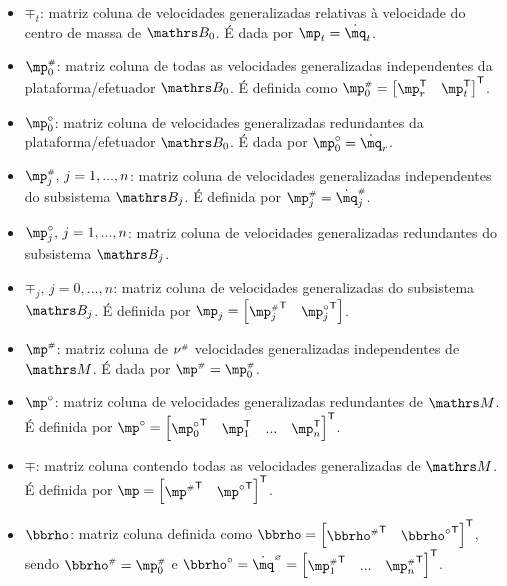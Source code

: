 \documentclass[a4paper,11pt,brazil,fleqn]{article}
\begin{document}
\begin{itemize}
\item $\mp_t$: matriz coluna de velocidades generalizadas relativas \`a velocidade do centro de massa de $\ssB_0$. \'E dada por $\mp_t = \dot{\mq}_t$.
\item $\mp\ssh_0$: matriz coluna de todas as velocidades generalizadas independentes da plataforma/efetuador $\ssB_0$. \'E definida como $\mp\ssh_0 = \begin{bmatrix} \mp_r^\msT & \mp_t^\msT \end{bmatrix}^\msT$.
\item $\mp\cir_0$: matriz coluna de velocidades generalizadas redundantes da plataforma/efetuador $\ssB_0$. \'E dada por $\mp\cir_0 = \dot{\mq}_r$.
\item $\mp_j\ssh, \,j=1, ..., n$: matriz coluna de velocidades generalizadas independentes do subsistema  $\ssB_j$. \'E definida por $\mp_j\ssh = \dot{\mq}_j\ssh$.
\item $\mp_j\cir, \,j=1, ..., n$: matriz coluna de velocidades generalizadas redundantes do subsistema  $\ssB_j$.
\item $\mp_j, \,j=0, ..., n$: matriz coluna de velocidades generalizadas do subsistema  $\ssB_j$. \'E definida por $\mp_j = \begin{bmatrix} {\mp_j\ssh}^\msT & {\mp_j\cir}^\msT \end{bmatrix}$.
\item $\mp\ssh$: matriz coluna de $\nu^{\scriptscriptstyle \#}$ velocidades generalizadas independentes de $\ssM$. \'E dada por $\mp\ssh = \mp_0\ssh$.
\item $\mp\cir$: matriz coluna de velocidades generalizadas redundantes de $\ssM$. \'E definida por $\mp\cir = \begin{bmatrix} {\mp\cir_0}^\msT & \mp_1^\msT & ... & \mp_{n}^\msT \end{bmatrix}^\msT $.
\item $\mp$: matriz coluna contendo todas as velocidades generalizadas de $\ssM$. \'E definida por $\mp = \begin{bmatrix} {\mp\ssh}^\msT & {\mp\cir}^\msT \end{bmatrix}^\msT $.
\item $\mrho$: matriz coluna definida como $\mrho = \begin{bmatrix} {\mrho\ssh}^\msT & {\mrho\cir}^\msT \end{bmatrix}^\msT $, sendo $\mrho\ssh = \mp_0\ssh$ e $\mrho\cir = \dot{\mq}\hcir = \begin{bmatrix} {\mp\ssh_1}^\msT & ... &  {\mp\ssh_n}^\msT \end{bmatrix}^\msT $.

\end{itemize}
\end{document}
